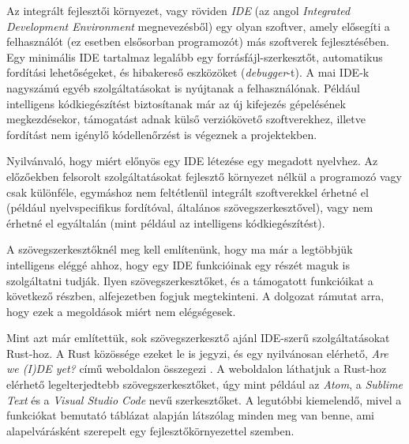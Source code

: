 


Az integrált fejlesztői környezet, vagy röviden \emph{IDE} (az angol \emph{Integrated Development Environment} megnevezésből) 
egy olyan szoftver, amely elősegíti a felhasználót (ez esetben elsősorban programozót) más szoftverek fejlesztésében. 
Egy minimális IDE tartalmaz legalább egy forrásfájl-szerkesztőt, automatikus fordítási lehetőségeket, 
és hibakereső eszközöket (\textit{debugger}-t). A mai IDE-k nagyszámú egyéb szolgáltatásokat is nyújtanak a felhasználónak.
Például intelligens kódkiegészítést biztosítanak már az új kifejezés gépelésének megkezdésekor, támogatást adnak külső verziókövető szoftverekhez, illetve fordítást nem igénylő kódellenőrzést is végeznek a projektekben.

Nyilvánvaló, hogy miért előnyös egy IDE létezése egy megadott nyelvhez. Az előzőekben felsorolt szolgáltatásokat fejlesztő környezet nélkül a programozó vagy csak különféle, egymáshoz nem feltétlenül integrált szoftverekkel érhetné el 
(például nyelvspecifikus fordítóval, általános szövegszerkesztővel), 
vagy nem érhetné el egyáltalán (mint például az intelligens kódkiegészítést).

A szövegszerkesztőknél meg kell említenünk, hogy ma már a legtöbbjük intelligens eléggé ahhoz, 
hogy egy IDE funkcióinak egy részét maguk is szolgáltatni tudják.
Ilyen szövegszerkesztőket, és a támogatott funkcióikat a következő részben,  alfejezetben fogjuk megtekinteni. A dolgozat rámutat arra, hogy ezek a megoldások miért nem elégségesek.

\label{sec:ides}

Mint azt már említettük, sok szövegszerkesztő ajánl IDE-szerű szolgáltatásokat Rust-hoz. 
A Rust közössége ezeket le is jegyzi, és egy nyilvánosan elérhető, 
\emph{Are we (I)DE yet?} című weboldalon összegezi \cite{ideyet}. A weboldalon láthatjuk a Rust-hoz elérhető legelterjedtebb szövegszerkesztőket, úgy mint például az \textit{Atom}, a \textit{Sublime Text} és a \textit{Visual Studio Code} nevű szerkesztőket. 
A legutóbbi kiemelendő, mivel a funkciókat bemutató táblázat alapján látszólag minden meg van benne, ami alapelvárásként szerepelt egy fejlesztőkörnyezettel szemben.


